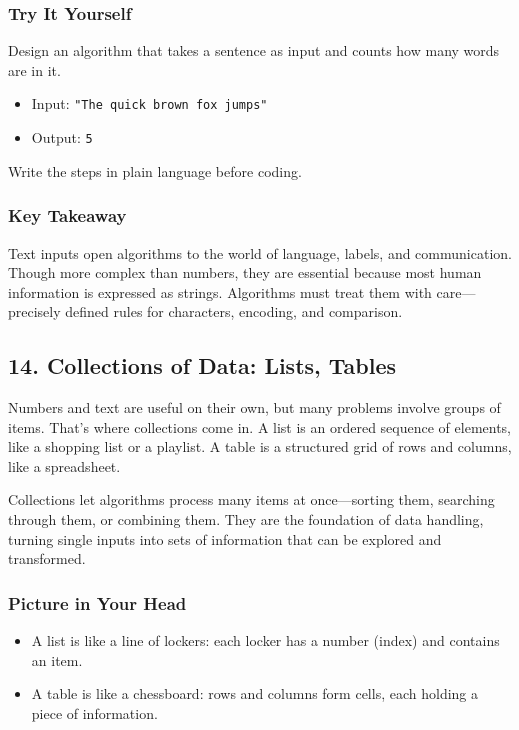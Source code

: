 \documentclass[
  letterpaper,
  DIV=11,
  numbers=noendperiod]{scrreprt}
\providecommand{\tightlist}{%
  \setlength{\itemsep}{0pt}\setlength{\parskip}{0pt}}
\begin{document}
\subsubsection{Try It Yourself}\label{try-it-yourself-12}

Design an algorithm that takes a sentence as input and counts how many
words are in it.

\begin{itemize}
\tightlist
\item
  Input: \texttt{"The\ quick\ brown\ fox\ jumps"}
\item
  Output: \texttt{5}
\end{itemize}

Write the steps in plain language before coding.

\subsubsection{Key Takeaway}\label{key-takeaway-11}

Text inputs open algorithms to the world of language, labels, and
communication. Though more complex than numbers, they are essential
because most human information is expressed as strings. Algorithms must
treat them with care---precisely defined rules for characters, encoding,
and comparison.

\subsection{14. Collections of Data: Lists,
Tables}\label{collections-of-data-lists-tables}

Numbers and text are useful on their own, but many problems involve
groups of items. That's where collections come in. A list is an ordered
sequence of elements, like a shopping list or a playlist. A table is a
structured grid of rows and columns, like a spreadsheet.

Collections let algorithms process many items at once---sorting them,
searching through them, or combining them. They are the foundation of
data handling, turning single inputs into sets of information that can
be explored and transformed.

\subsubsection{Picture in Your Head}\label{picture-in-your-head-13}

\begin{itemize}
\tightlist
\item
  A list is like a line of lockers: each locker has a number (index) and
  contains an item.
\item
  A table is like a chessboard: rows and columns form cells, each
  holding a piece of information.
\end{itemize}
\end{document}
